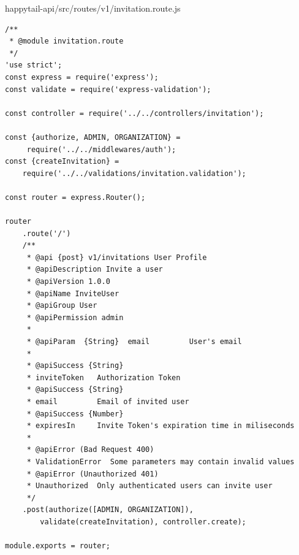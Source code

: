 \documentclass[12pt]{article}
\begin{document}
  \normalsize
 happytail-api/src/routes/v1/invitation.route.js
 \footnotesize
\begin{verbatim}
/**
 * @module invitation.route
 */
'use strict';
const express = require('express');
const validate = require('express-validation');

const controller = require('../../controllers/invitation');

const {authorize, ADMIN, ORGANIZATION} =
	 require('../../middlewares/auth');
const {createInvitation} = 
	require('../../validations/invitation.validation');

const router = express.Router();

router
    .route('/')
    /**
     * @api {post} v1/invitations User Profile
     * @apiDescription Invite a user
     * @apiVersion 1.0.0
     * @apiName InviteUser
     * @apiGroup User
     * @apiPermission admin
     *
     * @apiParam  {String}  email         User's email
     *
     * @apiSuccess {String}  
     * inviteToken   Authorization Token
     * @apiSuccess {String}  
     * email         Email of invited user
     * @apiSuccess {Number}  
     * expiresIn     Invite Token's expiration time in miliseconds
     *
     * @apiError (Bad Request 400)   
     * ValidationError  Some parameters may contain invalid values
     * @apiError (Unauthorized 401) 
     * Unauthorized  Only authenticated users can invite user
     */
    .post(authorize([ADMIN, ORGANIZATION]), 
    	validate(createInvitation), controller.create);

module.exports = router;

 \end{verbatim}
 
\end{document}

